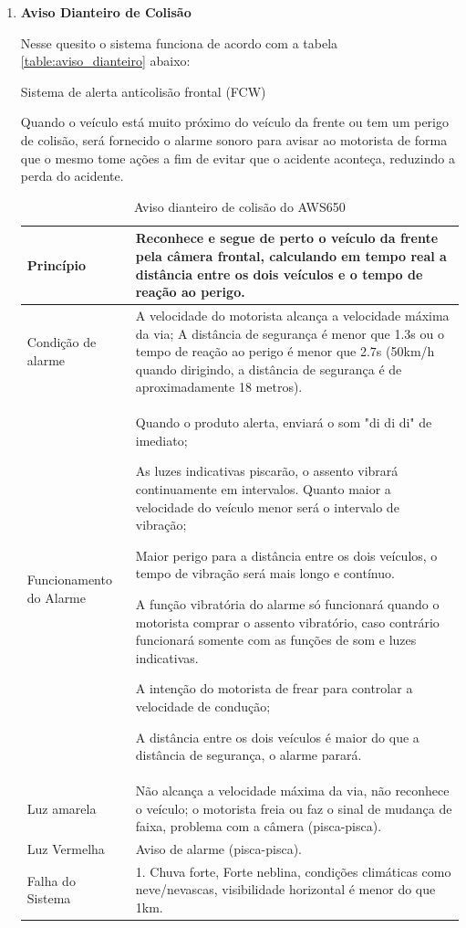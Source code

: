 \begin{enumerate}
\item \textbf{Aviso Dianteiro de Colisão}

Nesse quesito o sistema funciona de acordo com a tabela \ref{table:aviso_dianteiro} abaixo:

Sistema de alerta anticolisão frontal (FCW)

Quando o veículo está muito próximo do veículo da frente ou tem um perigo de colisão, será fornecido o alarme sonoro para avisar ao motorista de forma que o mesmo tome ações a fim de evitar que o acidente aconteça, reduzindo a perda do acidente.

\begin{table}[ht]
\caption{Aviso dianteiro de colisão do AWS650}
\centering
\begin{tabular}{| l |  p{10cm} |}
\hline
Princípio & Reconhece e segue de perto o veículo da frente pela câmera frontal, calculando em tempo real a distância entre os dois veículos e o tempo de reação ao perigo. \\
\hline
Condição de alarme & A velocidade do motorista alcança a velocidade máxima da via;
A distância de segurança é menor que 1.3s ou o tempo de reação ao perigo é menor que 2.7s (50km/h quando dirigindo, a distância de segurança é de aproximadamente 18 metros).
\\
\hline
Funcionamento do Alarme & Quando o produto alerta, enviará o som "di di di" de imediato;

As luzes indicativas piscarão, o assento vibrará continuamente em intervalos. Quanto maior a velocidade do veículo menor será o intervalo de vibração;

Maior perigo para a distância entre os dois veículos, o tempo de vibração será mais longo e contínuo.

A função vibratória do alarme só funcionará quando o motorista comprar o assento vibratório, caso contrário funcionará somente com as funções de som e luzes indicativas.

A intenção do motorista de frear para controlar a velocidade de condução;

A distância entre os dois veículos é maior do que a distância de segurança, o alarme parará.
 \\
\hline
Luz amarela & Não alcança a velocidade máxima da via, não reconhece o veículo; o motorista freia ou faz o sinal de mudança de faixa, problema com a câmera (pisca-pisca).
 \\
\hline
Luz Vermelha & Aviso de alarme (pisca-pisca). \\
\hline
Falha do Sistema & 1. Chuva forte, Forte neblina, condições climáticas como neve/nevascas, visibilidade horizontal é menor do que 1km.


\end{tabular}
\end{table}
\end{enumerate}

